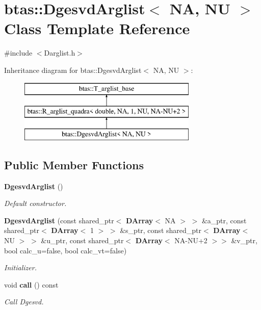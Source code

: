 \section{btas\-:\-:Dgesvd\-Arglist$<$ N\-A, N\-U $>$ Class Template Reference}
\label{d5/d3c/classbtas_1_1DgesvdArglist}


{\ttfamily \#include $<$Darglist.\-h$>$}

Inheritance diagram for btas\-:\-:Dgesvd\-Arglist$<$ N\-A, N\-U $>$\-:\begin{figure}[H]
\begin{center}
\leavevmode
\includegraphics[height=3.000000cm]{d5/d3c/classbtas_1_1DgesvdArglist}
\end{center}
\end{figure}
\subsection*{Public Member Functions}
\begin{DoxyCompactItemize}
\item 
{\bf Dgesvd\-Arglist} ()
\begin{DoxyCompactList}\small\item\em Default constructor. \end{DoxyCompactList}\item 
{\bf Dgesvd\-Arglist} (const shared\-\_\-ptr$<$ {\bf D\-Array}$<$ N\-A $>$ $>$ \&a\-\_\-ptr, const shared\-\_\-ptr$<$ {\bf D\-Array}$<$ 1 $>$ $>$ \&s\-\_\-ptr, const shared\-\_\-ptr$<$ {\bf D\-Array}$<$ N\-U $>$ $>$ \&u\-\_\-ptr, const shared\-\_\-ptr$<$ {\bf D\-Array}$<$ N\-A-\/N\-U+2 $>$$>$ \&v\-\_\-ptr, bool calc\-\_\-u=false, bool calc\-\_\-vt=false)
\begin{DoxyCompactList}\small\item\em Initializer. \end{DoxyCompactList}\item 
void {\bf call} () const 
\begin{DoxyCompactList}\small\item\em Call Dgesvd. \end{DoxyCompactList}\end{DoxyCompactItemize}
